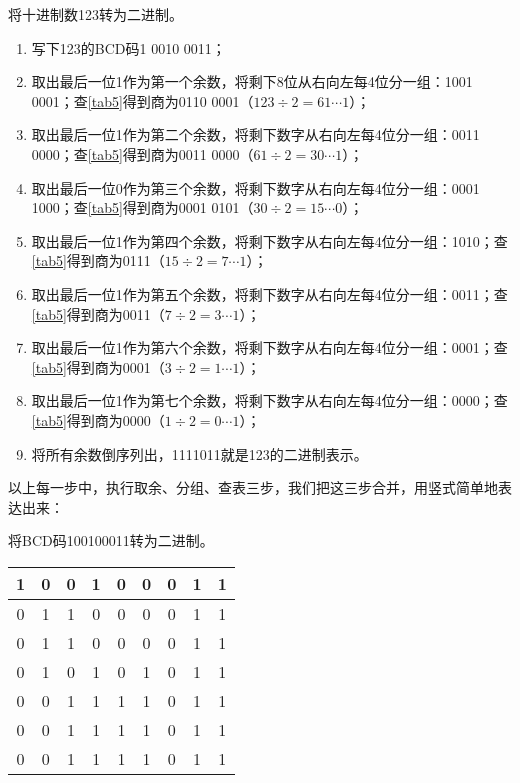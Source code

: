 \begin{example}{}{}\label{exa2}
将十进制数123转为二进制。
\begin{enumerate}
\item 写下123的BCD码1 0010 0011；
\item 取出最后一位1作为第一个余数，将剩下8位从右向左每4位分一组：1001 0001；查\autoref{tab5}得到商为0110 0001（$123\div 2=61\cdots 1$）；
\item 取出最后一位1作为第二个余数，将剩下数字从右向左每4位分一组：0011 0000；查\autoref{tab5}得到商为0011 0000（$61\div 2=30\cdots 1$）；
\item 取出最后一位0作为第三个余数，将剩下数字从右向左每4位分一组：0001 1000；查\autoref{tab5}得到商为0001 0101（$30\div 2=15\cdots 0$）；
\item 取出最后一位1作为第四个余数，将剩下数字从右向左每4位分一组：1010；查\autoref{tab5}得到商为0111（$15\div 2=7\cdots 1$）；
\item 取出最后一位1作为第五个余数，将剩下数字从右向左每4位分一组：0011；查\autoref{tab5}得到商为0011（$7\div 2=3\cdots 1$）；
\item 取出最后一位1作为第六个余数，将剩下数字从右向左每4位分一组：0001；查\autoref{tab5}得到商为0001（$3\div 2=1\cdots 1$）；
\item 取出最后一位1作为第七个余数，将剩下数字从右向左每4位分一组：0000；查\autoref{tab5}得到商为0000（$1\div 2=0\cdots 1$）；
\item 将所有余数倒序列出，1111011就是123的二进制表示。
\end{enumerate}
\end{example}

以上每一步中，执行取余、分组、查表三步，我们把这三步合并，用竖式简单地表达出来：
\begin{example}{}{}\label{exa1}
将BCD码100100011转为二进制。
\begin{center}
\begin{tabular}{|ccccccccc|}
\hline
1&0&0&1&\multicolumn{1}{|c}{0}&0&0&1&\multicolumn{1}{|c|}{1}\\\hline
0&1&1&\multicolumn{1}{|c}{0}&0&0&0&\multicolumn{1}{|c}{1}&1\\\hline
0&1&\multicolumn{1}{|c}{1}&0&0&0&\multicolumn{1}{|c}{0}&1&1\\\hline
0&\multicolumn{1}{|c}{1}&0&1&0&\multicolumn{1}{|c}{1}&0&1&1\\\hline
0&0&1&1&\multicolumn{1}{|c}{1}&1&0&1&1\\\hline
0&0&1&\multicolumn{1}{|c}{1}&1&1&0&1&1\\\hline
0&0&\multicolumn{1}{|c}{1}&1&1&1&0&1&1\\\hline
\end{tabular}
\end{center}
\end{example}

